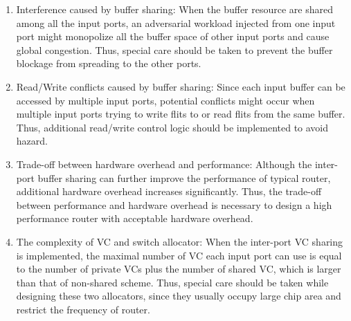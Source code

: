 \documentclass[10pt,conference]{IEEEtran}
\begin{document}
\begin{enumerate}
\item Interference caused by buffer sharing: When the buffer resource are shared among all the input ports, an adversarial workload injected from one input port might monopolize all the buffer space of other input ports and cause global congestion. Thus, special care should be taken to prevent the buffer blockage from spreading to the other ports.

\item Read/Write conflicts caused by buffer sharing: Since each input buffer can be accessed by multiple input ports, potential conflicts might occur when multiple input ports trying to write flits to or read flits from the same buffer. Thus, additional read/write control logic should be implemented to avoid hazard.

\item Trade-off between hardware overhead and performance: Although the inter-port buffer sharing can further improve the performance of typical router, additional hardware overhead increases significantly. Thus, the trade-off between performance and hardware overhead is necessary to design a high performance router with acceptable hardware overhead.

\item The complexity of VC and switch allocator: When the inter-port VC sharing is implemented, the maximal number of VC each input port can use is equal to the number of private VCs plus the number of shared VC, which is larger than that of non-shared scheme. Thus, special care should be taken while designing these two allocators, since they usually occupy large chip area and restrict the frequency of router.

\end{enumerate}
\end{document}
